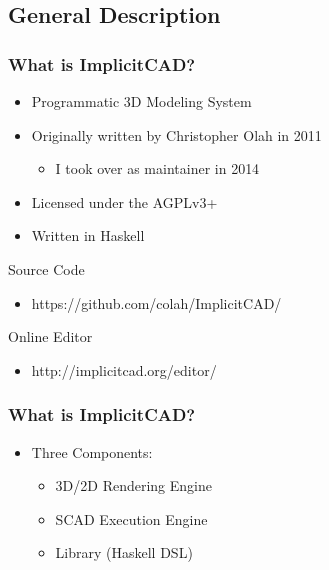 \documentclass{beamer}
\begin{document}
\subsection{General Description}
\begin{frame}
\frametitle{What is ImplicitCAD?}
\begin{itemize}
\item Programmatic 3D Modeling System
\item Originally written by Christopher Olah in 2011
  \begin{itemize}
  \item I took over as maintainer in 2014
  \end{itemize}
\item Licensed under the AGPLv3+
\item Written in Haskell
\end{itemize}
\begin{block}{Source Code}
\begin{itemize}
\item https://github.com/colah/ImplicitCAD/
\end{itemize}
\end{block}
\begin{block}{Online Editor}
\begin{itemize}
\item http://implicitcad.org/editor/
\end{itemize}
\end{block}
\end{frame}

\begin{frame}
\frametitle{What is ImplicitCAD?}
\begin{itemize}
\item Three Components:
  \begin{itemize}
  \item 3D/2D Rendering Engine
  \item SCAD Execution Engine
  \item Library (Haskell DSL)
  \end{itemize}
\end{itemize}
\end{frame}

\end{document}
